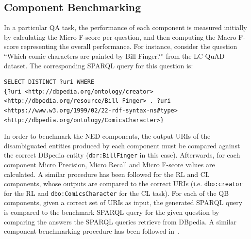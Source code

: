 \documentclass[sigconf,edbt]{acmart-edbt2019}
\newcommand{\qq}[1]{``#1''}
\begin{document}
\subsection{Component Benchmarking} \label{sec:benchmarking}
In a particular QA task, the performance of each component is measured initially by calculating the Micro F-score per question, and then computing the Macro F-score representing the overall performance.
For instance, consider the question \qq{Which comic characters are painted by Bill Finger?} from the LC-QuAD dataset. The corresponding SPARQL query for this question is:
\begin{lstlisting}[language=SPARQL]
SELECT DISTINCT ?uri WHERE 
{?uri <http://dbpedia.org/ontology/creator> 
<http://dbpedia.org/resource/Bill_Finger> . ?uri 
<https://www.w3.org/1999/02/22-rdf-syntax-ns#type> 
<http://dbpedia.org/ontology/ComicsCharacter>}
\end{lstlisting}
In order to benchmark the NED components, the output URIs of the disambiguated entities produced by each component must be compared against the correct DBpedia entity (\texttt{dbr:Bill\:Finger} in this case). Afterwards, for each component Micro Precision, Micro Recall and Micro F-score values are calculated. A similar procedure has been followed for the RL and CL components, whose outputs are compared to the correct URIs (i.e. \texttt{dbo:creator} for the RL and \texttt{dbo:ComicsCharacter} for the CL task). For each of the QB components, given a correct set of URIs as input, the generated SPARQL query is compared to the benchmark SPARQL query for the given question by comparing the answers the SPARQL queries retrieve from DBpedia. A similar component benchmarking procedure has been followed in~\cite{DBLP:conf/i-semantics/MulangSO17,kcap}.
%
\end{document}
